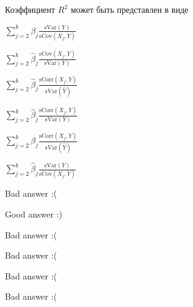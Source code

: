 
\begin{question}
Коэффициент \(R^2\) может быть представлен в виде
\begin{answerlist}
  \item \(\sum_{j=2}^k \beta_j \frac{\mathrm{sVar}(Y)}{\mathrm{sCov}(X_j, Y)}\)
  \item \(\sum_{j=2}^k \hat \beta_j \frac{\mathrm{sCov}(X_j, Y)}{\mathrm{sVar}(Y)}\)
  \item \(\sum_{j=2}^k \hat \beta_j \frac{\mathrm{sCorr}(X_j, Y)}{\mathrm{sVar}(\hat Y)}\)
  \item \(\sum_{j=2}^k \hat \beta_j \frac{\mathrm{sCorr}(X_j, Y)}{\mathrm{sVar}(Y)}\)
  \item \(\sum_{j=2}^k \beta_j \frac{\mathrm{sCorr}(X_j, Y)}{\mathrm{sVar}(\hat Y)}\)
  \item \(\sum_{j=2}^k \hat \beta_j \frac{\mathrm{sVar}(Y)}{\mathrm{sCov}(X_j, Y)}\)
\end{answerlist}
\end{question}

\begin{solution}
\begin{answerlist}
  \item Bad answer :(
  \item Good answer :)
  \item Bad answer :(
  \item Bad answer :(
  \item Bad answer :(
  \item Bad answer :(
\end{answerlist}
\end{solution}

